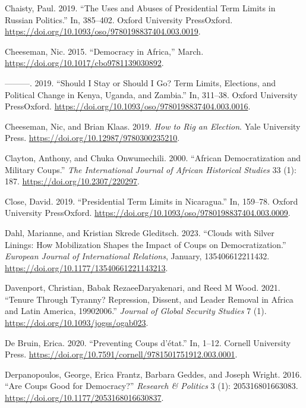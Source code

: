\documentclass[
  12pt,
]{report}
\newlength{\cslhangindent}
\newenvironment{CSLReferences}[2] %
 {\begin{list}{}{%
  \setlength{\itemindent}{0pt}
  \setlength{\leftmargin}{0pt}
  \setlength{\parsep}{0pt}
  \ifodd #1
   \setlength{\leftmargin}{\cslhangindent}
   \setlength{\itemindent}{-1\cslhangindent}
  \fi
  \setlength{\itemsep}{#2\baselineskip}}}
 {\end{list}}
\begin{document}
\begin{CSLReferences}{1}{0}
Chaisty, Paul. 2019. {``The Uses and Abuses of Presidential Term Limits
in Russian Politics.''} In, 385--402. Oxford University PressOxford.
\url{https://doi.org/10.1093/oso/9780198837404.003.0019}.

Cheeseman, Nic. 2015. {``Democracy in Africa,''} March.
\url{https://doi.org/10.1017/cbo9781139030892}.

---------. 2019. {``Should I Stay or Should I Go? Term Limits,
Elections, and Political Change in Kenya, Uganda, and Zambia.''} In,
311--38. Oxford University PressOxford.
\url{https://doi.org/10.1093/oso/9780198837404.003.0016}.

Cheeseman, Nic, and Brian Klaas. 2019. \emph{How to Rig an Election}.
Yale University Press. \url{https://doi.org/10.12987/9780300235210}.

Clayton, Anthony, and Chuka Onwumechili. 2000. {``African
Democratization and Military Coups.''} \emph{The International Journal
of African Historical Studies} 33 (1): 187.
\url{https://doi.org/10.2307/220297}.

Close, David. 2019. {``Presidential Term Limits in Nicaragua.''} In,
159--78. Oxford University PressOxford.
\url{https://doi.org/10.1093/oso/9780198837404.003.0009}.

Dahl, Marianne, and Kristian Skrede Gleditsch. 2023. {``Clouds with
Silver Linings: How Mobilization Shapes the Impact of Coups on
Democratization.''} \emph{European Journal of International Relations},
January, 135406612211432.
\url{https://doi.org/10.1177/13540661221143213}.

Davenport, Christian, Babak RezaeeDaryakenari, and Reed M Wood. 2021.
{``Tenure Through Tyranny? Repression, Dissent, and Leader Removal in
Africa and Latin America, 1990{\textendash}2006.''} \emph{Journal of
Global Security Studies} 7 (1).
\url{https://doi.org/10.1093/jogss/ogab023}.

De Bruin, Erica. 2020. {``Preventing Coups d{'}état.''} In, 1--12.
Cornell University Press.
\url{https://doi.org/10.7591/cornell/9781501751912.003.0001}.

Derpanopoulos, George, Erica Frantz, Barbara Geddes, and Joseph Wright.
2016. {``Are Coups Good for Democracy?''} \emph{Research \& Politics} 3
(1): 205316801663083. \url{https://doi.org/10.1177/2053168016630837}.


\end{CSLReferences}
\end{document}
